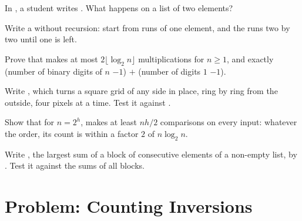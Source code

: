 \begin{exercise}[$\star\star$]\label{exo:g12:divide-and-conquer:10}
In , a student writes . What happens on a list of two elements?
\end{exercise}

\begin{exercise}[$\star\star$]\label{exo:g12:divide-and-conquer:11}
Write a  without recursion: start from runs of one element, and  the runs two by two until one is
left.
\end{exercise}

\begin{exercise}[$\star\star\star$]\label{exo:g12:divide-and-conquer:12}
Prove that  makes at most $2 \lfloor \log_2 n \rfloor$ multiplications for $n \ge 1$, and exactly
(number of binary digits of $n$ $- 1$) $+$ (number of digits $1$ $- 1$).
\end{exercise}

\begin{exercise}[$\star\star\star$]\label{exo:g12:divide-and-conquer:13}
Write , which turns a square grid of any side in place, ring by ring from the outside, four
pixels at a time. Test it against .
\end{exercise}

\begin{exercise}[$\star\star\star$]\label{exo:g12:divide-and-conquer:14}
Show that for $n = 2^h$,  makes at least $n h / 2$ comparisons on every input: whatever the order, its count
is within a factor $2$ of $n \log_2 n$.
\end{exercise}

\begin{exercise}[$\star\star\star$]\label{exo:g12:divide-and-conquer:15}
Write , the largest sum of a block of consecutive elements of a non-empty list, by . Test it against the sums of all blocks.
\end{exercise}

\section{Problem: Counting Inversions}\label{sec:g12:divide-and-conquer:problem}

